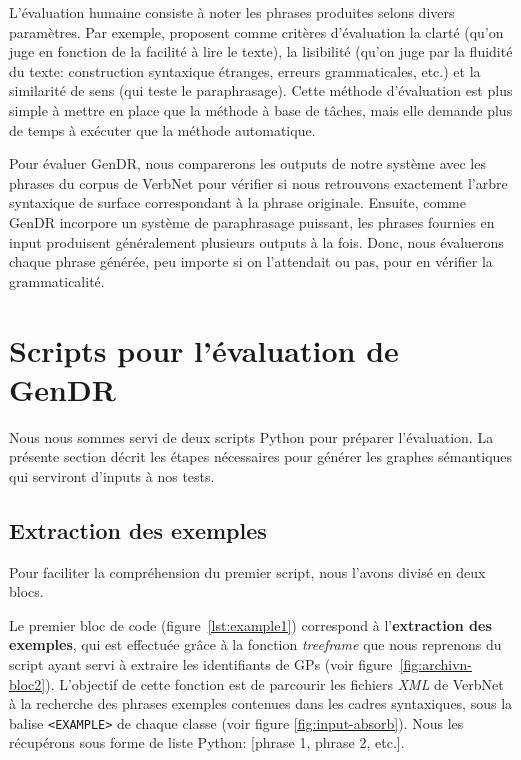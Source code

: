 L'évaluation humaine consiste à noter les phrases produites selons divers paramètres. Par exemple, \cite{BelzFirstSurfaceRealisation2011} proposent comme critères d'évaluation la clarté (qu'on juge en fonction de la facilité à lire le texte), la lisibilité (qu'on juge par la fluidité du texte: construction syntaxique étranges, erreurs grammaticales, etc.) et la similarité de sens (qui teste le paraphrasage). Cette méthode d'évaluation est plus simple à mettre en place que la méthode à base de tâches, mais elle demande plus de temps à exécuter que la méthode automatique.

Pour évaluer GenDR, nous comparerons les outputs de notre système avec les phrases du corpus de VerbNet pour vérifier si nous retrouvons exactement l'arbre syntaxique de surface correspondant à la phrase originale. Ensuite, comme GenDR incorpore un système de paraphrasage puissant, les phrases fournies en input produisent généralement plusieurs outputs à la fois. Donc, nous évaluerons chaque phrase générée, peu importe si on l'attendait ou pas, pour en vérifier la grammaticalité.

\section{Scripts pour l'évaluation de GenDR}

Nous nous sommes servi de deux scripts Python pour préparer l'évaluation. La présente section décrit les étapes nécessaires pour générer les graphes sémantiques qui serviront d'inputs à nos tests.

\subsection{Extraction des exemples}

Pour faciliter la compréhension du premier script, nous l'avons divisé en deux blocs. 

Le premier bloc de code (figure~\ref{lst:example1}) correspond à l'\textbf{extraction des exemples}, qui est effectuée grâce à la fonction \emph{treeframe} que nous reprenons du script ayant servi à extraire les identifiants de \acp{GP} (voir figure~\ref{fig:archivn-bloc2}). L'objectif de cette fonction est de parcourir les fichiers \emph{XML} de VerbNet à la recherche des phrases exemples contenues dans les cadres syntaxiques, sous la balise \texttt{<EXAMPLE>} de chaque classe (voir figure \ref{fig:input-absorb}). Nous les récupérons sous forme de liste Python: [phrase 1, phrase 2, etc.].

